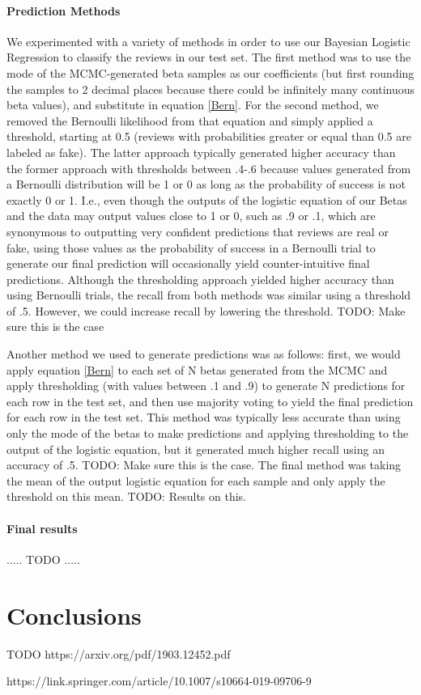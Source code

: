 \documentclass[man, floatsintext, 10pt]{apa6}
\begin{document}
\vspace{2mm}

\paragraph{Prediction Methods} We experimented with a variety of methods in order to use our Bayesian Logistic Regression to classify the reviews in our test set. The first method was to use the mode of the MCMC-generated beta samples as our coefficients (but first rounding the samples to 2 decimal places because there could be infinitely many continuous beta values), and substitute in equation \ref{Bern}. For the second method, we removed the Bernoulli likelihood from that equation and simply applied a threshold, starting at 0.5 (reviews with probabilities greater or equal than 0.5 are labeled as fake). The latter approach typically generated higher accuracy than the former approach with thresholds between .4-.6 because values generated from a Bernoulli distribution will be 1 or 0 as long as the probability of success is not exactly 0 or 1. I.e., even though the outputs of the logistic equation of our Betas and the data may output values close to 1 or 0, such as .9 or .1, which are synonymous to outputting very confident predictions that reviews are real or fake, using those values as the probability of success in a Bernoulli trial to generate our final prediction will occasionally yield counter-intuitive final predictions. Although the thresholding approach yielded higher accuracy than using Bernoulli trials, the recall from both methods was similar using a threshold of .5. However, we could increase recall by lowering the threshold. TODO: Make sure this is the case

Another method we used to generate predictions was as follows: first, we would apply equation \ref{Bern} to each set of N betas generated from the MCMC and apply thresholding (with values between .1 and .9) to generate N predictions for each row in the test set, and then use majority voting to yield the final prediction for each row in the test set. This method was typically less accurate than using only the mode of the betas to make predictions and applying thresholding to the output of the logistic equation, but it generated much higher recall using an accuracy of .5. TODO: Make sure this is the case. The final method was taking the mean of the output logistic equation for each sample and only apply the threshold on this mean. TODO: Results on this.

\paragraph{Final results} ..... TODO .....

\section{Conclusions} 

TODO https://arxiv.org/pdf/1903.12452.pdf

https://link.springer.com/article/10.1007/s10664-019-09706-9
\end{document}
